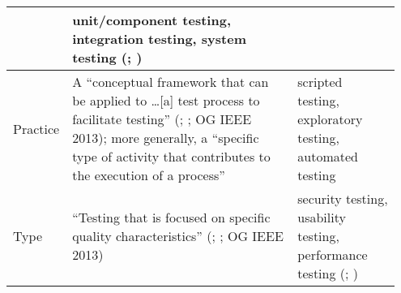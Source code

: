 \begin{table}[hbtp!]
\begin{minipage}{\linewidth}
\begin{tabular}{|>{\centering}m{0.08\linewidth}m{0.6\linewidth}m{0.27\linewidth}|}
            \citeyearpar[p.~249]{IEEE2017}          & unit/component testing,
            integration testing, system testing (\citealp[p.~12]{IEEE2022};
            \citeyear[p.~467]{IEEE2017})                                                                         \\
            \hline
            Practice                                & A ``conceptual framework
            that can be applied to \dots [a] test process to facilitate testing''
            (\citealp[p.~14]{IEEE2022}; \citeyear[p.~471]{IEEE2017}; OG IEEE 2013);
            more generally, a ``specific type of activity
            that contributes to the execution of a process''
            \citeyearpar[p.~331]{IEEE2017}          & scripted testing,
            exploratory testing, automated testing \citep[p.~20]{IEEE2022}                                       \\
            \hline
            Type                                    & ``Testing that is focused
            on specific quality characteristics''
            (\citealp[p.~15]{IEEE2022}; \citeyear[p.~473]{IEEE2017};
            OG IEEE 2013)                           & security testing, usability testing,
            performance testing (\citealp[p.~15]{IEEE2022};
            \citeyear[p.~473]{IEEE2017})                                                                         \\
            \hline
        \end{tabular}
    \end{minipage}
\end{table}
